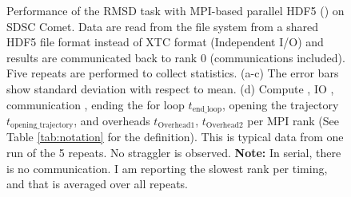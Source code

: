 \begin{figure}[ht!]
\begin{subfigure} {.5\textwidth}
  \label{fig:MPIranks-hdf5}
\end{subfigure}
%
\caption{Performance of the RMSD task with MPI-based parallel HDF5 () on SDSC Comet.
Data are read from the file system from a shared HDF5 file format instead of XTC format (Independent I/O) and results are communicated back to rank 0 (communications included). 
Five repeats are performed to collect statistics. (a-c) The error bars show standard deviation with respect to mean. (d) Compute \tcomp, IO \tIO, communication \tcomm, ending the for loop \texttt{$t_{\text{end\_loop}}$},
  opening the trajectory \texttt{$t_{\text{opening\_trajectory}}$}, and overheads \texttt{$t_{\text{Overhead1}}$},  \texttt{$t_{\text{Overhead2}}$} per MPI rank (See Table \ref{tab:notation} for the definition).
  This is typical data from one run of the 5 repeats. No straggler is observed. \textbf{Note:} In serial, there is no communication. I am reporting the slowest rank per timing, and that is averaged over all repeats.}
\label{fig:MPIwithIO-hdf5}
\end{figure}
